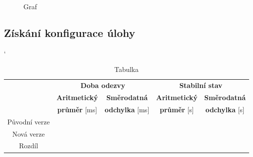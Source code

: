             \begin{figure}[h!t]
                \begin{center}
                    \caption{Graf}
                    \label{imgGetMainPageCast}
                \end{center}
            \end{figure}




        \subsection{Získání konfigurace úlohy}


            \begin{table}[ht]
             \catcode`
             \begin{center}
              \begin{tabular}{| c || c | c || c | c |} \hline
                \multirow{3}{*}{}  &   \multicolumn{2}{c||}{\textbf{Doba odezvy}}  &  \multicolumn{2}{c|}{\textbf{Stabilní stav}}\\ \cline{2-5}
                 & \textbf{Aritmetický}  &  \textbf{Směrodatná}  &  \textbf{Aritmetický} &  \textbf{Směrodatná}\\ 
                 & \textbf{průměr} [ms]  &  \textbf{odchylka} [ms]  &  \textbf{průměr} [s]  &  \textbf{odchylka} [s]\\ \hline
                Původní verze &   &   &   &  \\\hline
                Nová verze &   &   &   &  \\\hline
                Rozdíl &   &   &   &  \\\hline  
              \end{tabular}
              \caption{Tabulka}
              \label{tab4}
             \end{center}
            \end{table}


